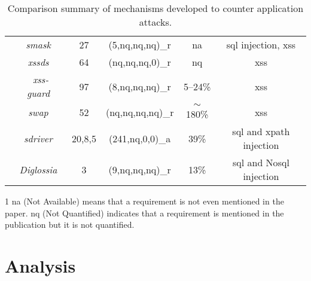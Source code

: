 \documentclass[conference]{IEEEtran}
\newcommand{\xmark}{\ding{56}}
\begin{document}
\begin{landscape}
\begin{table}
\begin{threeparttable}
\begin{small}
{\begin{tabular}{l|c|c|cc|c}
	& 	{\it {\sc sm}ask}~\cite{JB07} & 27 & (5,{\sc nq},{\sc nq},{\sc nq})\_r  & {\sc na} & {\sc sql} injection, {\sc xss} \\
	& 	{\it {\sc xssds}}~\cite{JEP08} & 64 & ({\sc nq},{\sc nq},{\sc nq},0)\_r & {\sc nq} &  {\sc xss} \\
    & 	{\it {\sc xss-guard}}~\cite{BV08} & 97 & (8,{\sc nq},{\sc nq},{\sc nq})\_r & 5--24\% & {\sc xss} \\
    & 	{\it {\sc swap}}~\cite{WPLKK09} & 52 & ({\sc nq},{\sc nq},{\sc nq},{\sc nq})\_r & $\sim$180\% & {\sc xss} \\ 
	& 	{\it {\sc sd}river}~\cite{MS09,MKS09,MKLS11} & 20,8,5 & (241,{\sc nq},0,0)\_a & 39\% & {\sc sql} and {\sc xp}ath injection \\
	& 	{\it Diglossia}~\cite{SMS13} & 3 & (9,{\sc nq},{\sc nq},{\sc nq})\_r & 13\% & {\sc sql} and No{\sc sql} injection \\
	\hline
    \end{tabular}}
    \begin{tablenotes}
	\begin{footnotesize}
       \item[1] {\sc na} (Not Available) means that a requirement is not even mentioned in the paper.
	{\sc nq} (Not Quantified) indicates that a requirement is mentioned in the publication
	but it is not quantified.
	\end{footnotesize}
    \end{tablenotes}
    \caption{Comparison summary of mechanisms developed to counter application attacks.}
    \label{tab:comp2}
    \end{small}
    \end{threeparttable}
\end{table}
\end{landscape}

\section{Analysis}
\end{document}
